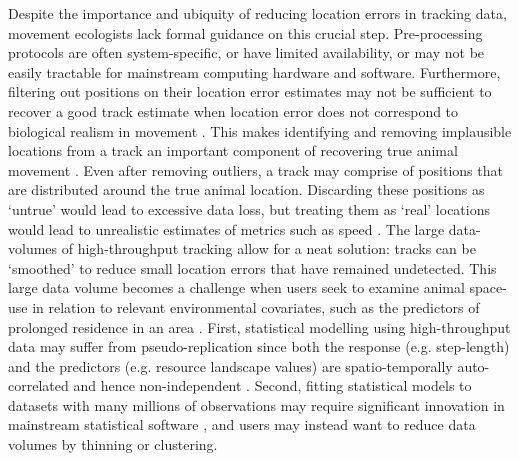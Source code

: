 \documentclass[10pt,paper=a4,headings=standardclasses
]{scrartcl}
\begin{document}
Despite the importance and ubiquity of reducing location errors in tracking data, movement ecologists lack formal guidance on this crucial step.
Pre-processing protocols are often system-specific, or have limited availability, or may not be easily tractable for mainstream computing hardware and software.
Furthermore, filtering out positions on their location error estimates may not be sufficient to recover a good track estimate when location error does not correspond to biological realism in movement \citep{weiser2016, ranacher2016}.
This makes identifying and removing implausible locations from a track an important component of recovering true animal movement \citep{bjorneraas2010}.
Even after removing outliers, a track may comprise of positions that are distributed around the true animal location.
Discarding these positions as `untrue' would lead to excessive data loss, but treating them as `real' locations would lead to unrealistic estimates of metrics such as speed \citep{noonan2019}.
The large data-volumes of high-throughput tracking allow for a neat solution: tracks can be `smoothed' to reduce small location errors that have remained undetected.
This large data volume becomes a challenge when users seek to examine animal space-use in relation to relevant environmental covariates, such as the predictors of prolonged residence in an area \citep[see][]{bracis2018}.
First, statistical modelling using high-throughput data may suffer from pseudo-replication since both the response (e.g. step-length) and the predictors (e.g. resource landscape values) are spatio-temporally auto-correlated and hence non-independent \citep{aarts2008, fleming2014a,bijleveld2016, oudman2018, harel2016}.
Second, fitting statistical models to datasets with many millions of observations may require significant innovation in mainstream statistical software \citep[e.g. ][]{wood2015}, and users may instead want to reduce data volumes by thinning or clustering.
\end{document}
